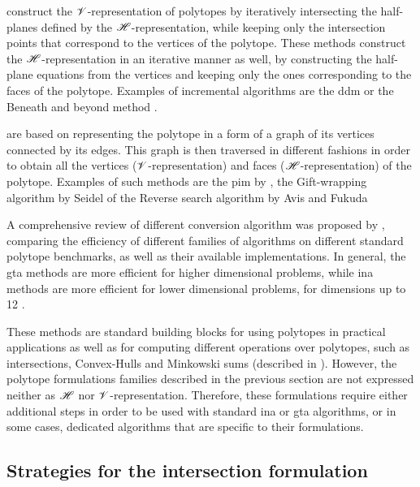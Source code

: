  construct the $\mathscr{V}$-representation of polytopes by iteratively intersecting the half-planes defined by the $\mathscr{H}$-representation, while keeping only the intersection points that correspond to the vertices of the polytope. These methods construct the $\mathscr{H}$-representation in an iterative manner as well, by constructing the half-plane equations from the vertices and keeping only the ones corresponding to the faces of the polytope. Examples of incremental algorithms are the \gls{ddm} \cite{MotzkinR1953dd,fukuda_dd} or the Beneath and beyond method \cite{Seidel_1981}.

 are based on representing the polytope in a form of a graph of its vertices connected by its edges. This graph is then traversed in different fashions in order to obtain all the vertices ($\mathscr{V}$-representation) and faces ($\mathscr{H}$-representation) of the polytope. Examples of such methods are the \gls{pim} by \citet{bremner_fukuda_marzetta_1998}, the Gift-wrapping algorithm by Seidel \cite{Seidel1987outputsensitive} of the Reverse search algorithm by Avis and Fukuda \cite{avis_pivoting_nodate}

A comprehensive review of different conversion algorithm was proposed by \citet{avis1997how}, comparing the efficiency of different families of algorithms on different standard polytope benchmarks, as well as their available implementations. In general, the \gls{gta} methods are more efficient for higher dimensional problems, while \gls{ina} methods are more efficient for lower dimensional problems, for dimensions up to 12 \cite[Chapter 8.3]{fukuda2016lecture}.

These methods are standard building blocks for using polytopes in practical applications as well as for computing different operations over polytopes, such as intersections, Convex-Hulls and Minkowski sums (described in ). However, the polytope formulations families described in the previous section are not expressed neither as $\mathscr{H}$ nor $\mathscr{V}$-representation. Therefore, these formulations require either additional steps in order to be used with standard \gls{ina} or \gls{gta} algorithms, or in some cases, dedicated algorithms that are specific to their formulations. 


\subsection{Strategies for the intersection formulation}
\label{ch:intersection_algos}

